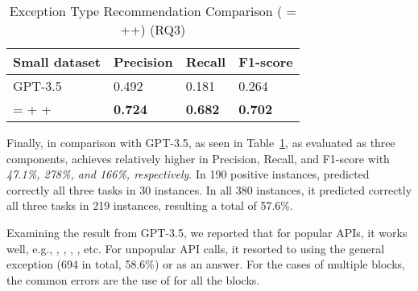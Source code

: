 \vspace{-12pt}
\begin{table}[htpb]
  \caption{Exception Type Recommendation Comparison ({\tool} = {\xblock}+{\xstate}+{\xtype}) (RQ3)}
  \vspace{-12pt}
  \tabcolsep 3pt
  \small
	\begin{center}
		\renewcommand{\arraystretch}{1}
		\begin{tabular}{| p{4.5cm}<{\centering} | p{1cm}<{\centering} | p{1cm}<{\centering}| p{1cm}<{\centering}|}
		  \hline
			Small dataset  & Precision  & Recall & F1-score \\
			\hline
                        GPT-3.5 & 0.492 & 0.181 & 0.264 \\
			\hline
			{\tool} = \xblock + \xstate  + \xtype  & \textbf{0.724}  &  \textbf{0.682} & \textbf{0.702}\\
			\hline
		\end{tabular}
		\label{tab:xtype-2}
	\end{center}

\end{table}

Finally, in comparison with GPT-3.5, as seen in
Table~\ref{tab:xtype-2}, {\tool} as evaluated as three components,
achieves relatively higher in Precision, Recall, and F1-score with
{\em 47.1\%, 278\%, and 166\%, respectively}. In 190 positive
instances, {\tool} predicted correctly all three tasks in 30
instances. In all 380 instances, it predicted correctly all
three tasks in 219 instances, resulting a total of 57.6\%.

Examining the result from GPT-3.5, we reported that for popular APIs,
it works well, e.g., ,
, ,
, etc. For
unpopular API calls, it resorted to using the general exception
 (694 in total, 58.6\%) or 
as an answer. For the cases of multiple  blocks, the
common errors are the use of  for all the blocks.

